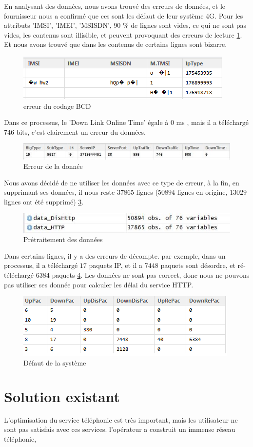 En analysant des données, nous avons trouvé des erreurs de données, et le fournisseur nous a confirmé que ces sont les défaut de leur système 4G. Pour les attributs 'IMSI', 'IMEI', 'MSISDN', $90$ \% de lignes sont vides, ce qui ne sont pas vides, les contenus sont illisible, et peuvent provoquant des erreurs de lecture \ref{fig:errorData}. Et nous avons trouvé que dans les contenus de certains lignes sont bizarre. 
\begin{figure}[H]
	\centering
	\includegraphics[width=0.7\linewidth]{images/errorData}
	\caption{erreur du codage BCD}
	\label{fig:errorData}
\end{figure}
Dans ce processus, le 'Down Link Online Time' égale à  $0$ ms , mais il a téléchargé $746$ bits, c'est clairement un erreur du données.
\begin{figure}[H]
	\centering
	\includegraphics[width=0.9\linewidth]{images/bizarre}
	\caption{Erreur de la donnée}
	\label{fig:bizarre}
\end{figure}

 Nous avons décidé de ne utiliser les données avec ce type de erreur, à la fin, en supprimant ses données, il nous reste $37865$ lignes ($50894$ lignes en origine, $13029$ lignes ont été supprimé)  \ref{fig:newdata}.
 
\begin{figure}[H]
	\centering
	\includegraphics[width=0.8\linewidth]{images/newdata}
	\caption{Prétraitement des données}
	\label{fig:newdata}
\end{figure}

Dans certains lignes, il y a des erreurs de décompte. par exemple, dans un processus, il a téléchargé  $17$ paquets IP, et il a  $7448$  paquets sont désordre, et  ré-téléchargé  $6384$ paquets  \ref{fig:défaut}. Les données ne sont pas correct, donc nous ne pouvons pas utiliser ses donnée pour calculer les délai du service HTTP.  
\begin{figure}[H]
	\centering
	\includegraphics[width=0.7\linewidth]{images/11}
	\caption{Défaut de la système}
	\label{fig:défaut}
\end{figure}

\section{Solution existant}     
L'optimisation du service téléphonie est très important, mais les utilisateur ne sont pas satisfais avec ces services. l'opérateur a construit un immense réseau téléphonie, 




